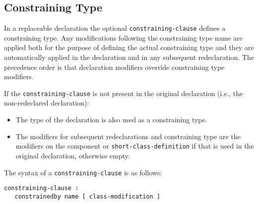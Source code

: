 \subsection{Constraining Type}\label{constraining-type}

In a replaceable declaration the optional \lstinline[language=grammar]!constraining-clause! defines a constraining type.
Any modifications following the constraining type name are applied both for the purpose of defining the actual constraining type and they are automatically applied in the declaration and in any subsequent redeclaration.
The precedence order is that declaration modifiers override constraining type modifiers.

If the \lstinline[language=grammar]!constraining-clause! is not present in the original declaration (i.e., the non-redeclared declaration):
\begin{itemize}
\item
  The type of the declaration is also used as a constraining type.
\item
  The modifiers for subsequent redeclarations and constraining type are the modifiers on the component or \lstinline[language=grammar]!short-class-definition! if that is used in the original declaration, otherwise empty.
\end{itemize}

The syntax of a \lstinline[language=grammar]!constraining-clause! is as follows:
\begin{lstlisting}[language=grammar]
constraining-clause :
   constrainedby name [ class-modification ]
\end{lstlisting}

